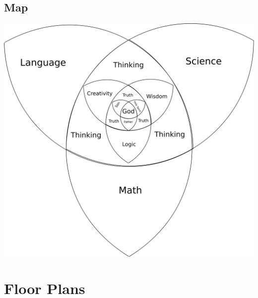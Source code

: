 \documentclass[CSHFoundation.tex]{subfiles}
\begin{document}
\subsection{Map}

\centerline{\includegraphics[scale=0.1]{6-curriculum.png}}


\section{Floor Plans}
\end{document}
